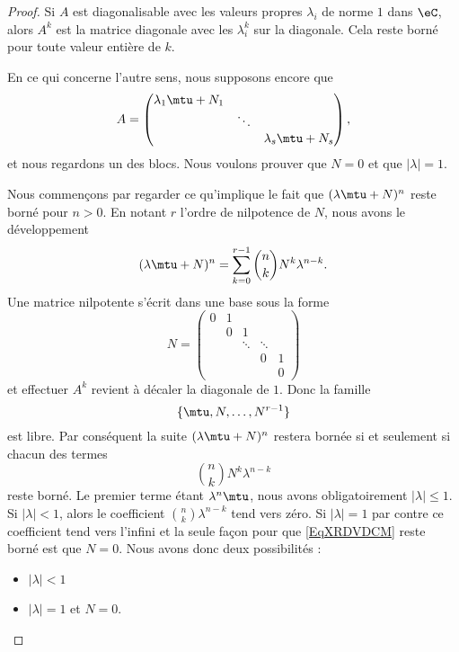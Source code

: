 \begin{proof}
    Si \( A\) est diagonalisable avec les valeurs propres \( \lambda_i\) de norme \( 1\) dans \( \eC\), alors \( A^k\) est la matrice diagonale avec les \( \lambda_i^k\) sur la diagonale. Cela reste borné pour toute valeur entière de \( k\).

    En ce qui concerne l'autre sens, nous supposons encore que
    \begin{equation}
        A=\begin{pmatrix}
            \lambda_1\mtu+N_1    &       &       \\
                &   \ddots    &       \\
                &       &   \lambda_s\mtu+N_s
        \end{pmatrix},
    \end{equation}
    et nous regardons un des blocs. Nous voulons prouver que \( N=0\) et que \( | \lambda |=1\).
    
    Nous commençons par regarder ce qu'implique le fait que \( (\lambda \mtu+N)^n\) reste borné pour \( n>0\). En notant \( r\) l'ordre de nilpotence de \( N\), nous avons le développement
    \begin{equation}
        (\lambda\mtu+N)^n=\sum_{k=0}^{r-1}\binom{ n }{ k }N^k\lambda^{n-k}.
    \end{equation}
    Une matrice nilpotente s'écrit dans une base sous la forme
    \begin{equation}
        N=\begin{pmatrix}
             0   &   1    &       &       \\
                &   0    &   1    &       \\
                & &   \ddots   &   \ddots    &      \\ 
                &&       &   0    &   1     \\
                &&       &      &   0     
         \end{pmatrix}
    \end{equation}
    et effectuer \( A^k\) revient à décaler la diagonale de \( 1\). Donc la famille
    \begin{equation}
        \{ \mtu,N,\ldots, N^{r-1} \}
    \end{equation}
    est libre. Par conséquent la suite \( (\lambda\mtu+N)^n\) restera bornée si et seulement si chacun des termes 
    \begin{equation}    \label{EqXRDVDCM}
        \binom{ n }{ k }N^k\lambda^{n-k}
    \end{equation}
    reste borné. Le premier terme étant \( \lambda^n\mtu\), nous avons obligatoirement \( | \lambda |\leq 1\). Si \( | \lambda |<1\), alors le coefficient \( \binom{ n }{ k }\lambda^{n-k}\) tend vers zéro. Si \( | \lambda |=1\) par contre ce coefficient tend vers l'infini et la seule façon pour que \eqref{EqXRDVDCM} reste borné est que \( N=0\). Nous avons donc deux possibilités :
    \begin{itemize}
        \item \( | \lambda |<1\)
        \item \( | \lambda |=1\) et \( N=0\).
    \end{itemize}


\end{proof}
